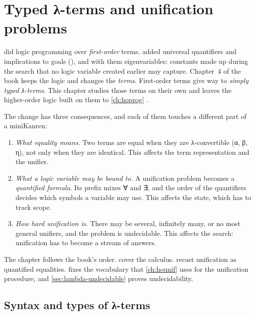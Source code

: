 \chapter{Typed λ-terms and unification problems}\label{ch:lambda}

 did logic programming over \emph{first-order} terms.  added
universal quantifiers and implications to goals (\fohh), and with them eigenvariables: constants made
up during the search that no logic variable created earlier may capture. Chapter~4 of the book
\cite{MillerNadathur2012} keeps the logic and changes the \emph{terms}. First-order terms give way to
\emph{simply typed λ-terms}. This chapter studies those terms on their own and leaves the higher-order
logic built on them to \cref{ch:hoprog} .

The change has three consequences, and each of them touches a different part of a miniKanren:
\begin{enumerate}[nosep]
  \item \emph{What equality means.} Two terms are equal when they are λ-convertible (α, β, η), not
        only when they are identical. This affects the term representation and the unifier.
  \item \emph{What a logic variable may be bound to.} A unification problem becomes a
        \emph{quantified formula}. Its prefix mixes ∀ and ∃, and the order of the quantifiers decides
        which symbols a variable may use. This affects the state, which has to track scope.
  \item \emph{How hard unification is.} There may be several, infinitely many, or no most general
        unifiers, and the problem is undecidable. This affects the search: unification has to become a
        stream of answers.
\end{enumerate}
The chapter follows the book's order. 
cover the calculus. 
recast unification as quantified equalities.  fixes the vocabulary that
\cref{ch:hounif} uses for the unification procedure, and \cref{sec:lambda-undecidable} proves
undecidability.

\section{Syntax and types of λ-terms}\label{sec:lambda-syntax}


